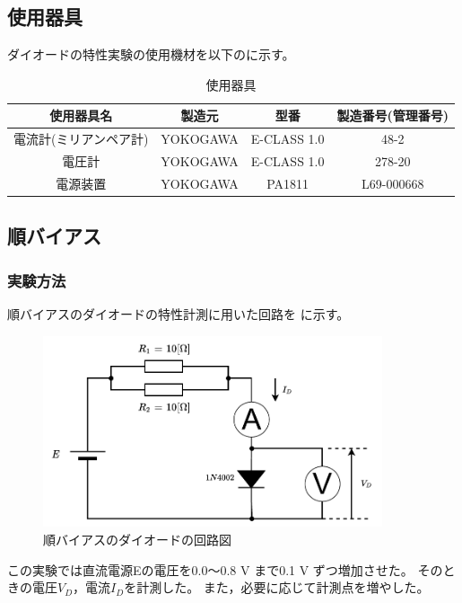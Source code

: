 \subsection{使用器具}
	ダイオードの特性実験の使用機材を以下のに示す。

	\begin{table}[hbt]
		\centering
		\caption{使用器具}
		\begin{tabular}{|c||c|c|c|} \hline
				使用器具名 & 製造元 & 型番 & 製造番号(管理番号)\\ \hline
				電流計(ミリアンペア計) & YOKOGAWA & E-CLASS 1.0 & 48-2 \\ \hline
				電圧計 & YOKOGAWA & E-CLASS 1.0 & 278-20 \\ \hline
				電源装置 & YOKOGAWA & PA1811 & L69-000668 \\ \hline
		\end{tabular}
		\label{tab:diode_apparatus}
	\end{table}

\subsection{順バイアス}
\subsubsection{実験方法}
  順バイアスのダイオードの特性計測に用いた回路を に示す。

  \begin{figure}[!h]
    \centering
    \includegraphics[width=10cm]{./pdfs/diode1.pdf}
    \caption{順バイアスのダイオードの回路図}
    \label{fig:diode1_circuit}
  \end{figure}

  この実験では直流電源Eの電圧を0.0～0.8 V まで0.1 V ずつ増加させた。
  そのときの電圧$V_D$，電流$I_D$を計測した。
  また，必要に応じて計測点を増やした。


